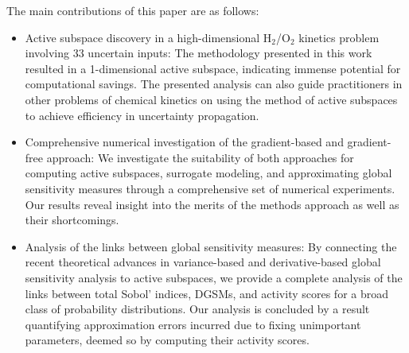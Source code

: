 The main contributions of this paper are as follows: 
\begin{itemize}
\item 
Active subspace
discovery in a high-dimensional H$_2$/O$_2$ kinetics problem involving 33
uncertain inputs: The methodology presented in this work
resulted in a 1-dimensional active subspace, indicating immense potential
for computational savings. The presented
analysis can also guide practitioners in other problems of chemical kinetics on using the
method of active subspaces to achieve efficiency in uncertainty propagation.  
\item Comprehensive numerical investigation of the gradient-based and gradient-free approach: 
We investigate the suitability of both approaches
for computing active subspaces, surrogate modeling, and approximating global
sensitivity measures through a comprehensive set of numerical experiments. Our
results reveal insight into the merits of the methods approach as well as
their shortcomings.  
\item Analysis of the links between  
global sensitivity measures: 
By connecting the recent theoretical advances in variance-based and
derivative-based global sensitivity analysis to active subspaces, we provide a complete analysis
of the links between total Sobol' indices, DGSMs, and activity scores for a broad
class of probability distributions. Our analysis is concluded by a result quantifying
approximation errors incurred due to fixing unimportant parameters, deemed so by 
computing their activity scores.  

\end{itemize}

